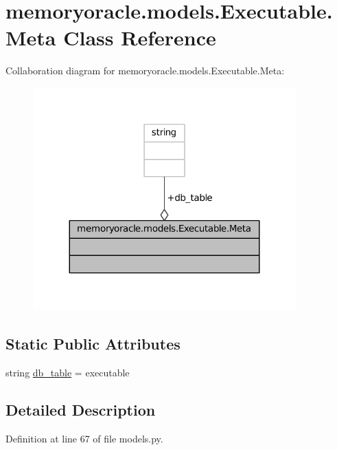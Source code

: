\hypertarget{classmemoryoracle_1_1models_1_1Executable_1_1Meta}{}\section{memoryoracle.\+models.\+Executable.\+Meta Class Reference}
\label{classmemoryoracle_1_1models_1_1Executable_1_1Meta}


Collaboration diagram for memoryoracle.\+models.\+Executable.\+Meta\+:\nopagebreak
\begin{figure}[H]
\begin{center}
\leavevmode
\includegraphics[width=287pt]{classmemoryoracle_1_1models_1_1Executable_1_1Meta__coll__graph}
\end{center}
\end{figure}
\subsection*{Static Public Attributes}
\begin{DoxyCompactItemize}
\item 
string \hyperlink{classmemoryoracle_1_1models_1_1Executable_1_1Meta_a54a6fadfefe4208844cf283cb523d707}{db\+\_\+table} = \textquotesingle{}executable\textquotesingle{}
\end{DoxyCompactItemize}


\subsection{Detailed Description}


Definition at line 67 of file models.\+py.



